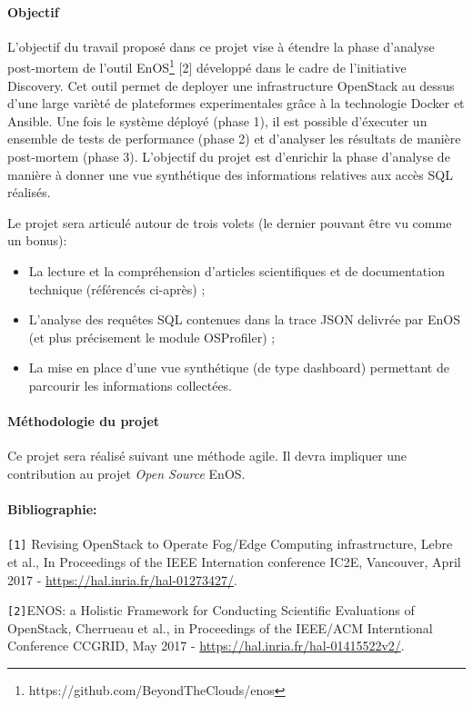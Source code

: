 \documentclass[a4paper,11pt]{article}
\begin{document}
\begin{note}
\paragraph*{Objectif\\}
L'objectif du travail proposé dans ce projet vise à étendre la phase
d'analyse post-mortem de l'outil
EnOS\footnote{https://github.com/BeyondTheClouds/enos} [2] développé dans
le cadre de l'initiative Discovery. Cet outil permet de
deployer une infrastructure OpenStack au dessus d'une large varièté de
plateformes experimentales grâce à la technologie Docker et Ansible.
Une fois le système déployé (phase 1), il est possible d'éxecuter un ensemble de tests de performance (phase 2) et d'analyser les résultats de manière post-mortem (phase 3).
L'objectif du projet est d'enrichir la phase d'analyse de manière à donner une vue synthétique des informations relatives aux accès SQL réalisés.

Le projet sera articulé autour de trois volets (le dernier pouvant être vu comme un bonus):
\begin{itemize}
\item La lecture et la compréhension d'articles scientifiques et de documentation technique (référencés ci-après) ; 
\item L'analyse des requêtes SQL contenues dans la trace JSON delivrée par EnOS (et plus précisement le module OSProfiler) ; 
\item La mise en place d'une vue synthétique (de type dashboard) permettant de parcourir les informations collectées.  
\end{itemize}

\paragraph*{Méthodologie du projet\\}
Ce projet sera réalisé suivant une méthode agile. Il devra impliquer une
contribution au projet \emph{Open Source} EnOS.


\paragraph*{Bibliographie:\\}
%
\texttt{[1]} Revising OpenStack to Operate Fog/Edge Computing infrastructure, Lebre et al., In Proceedings of the IEEE Internation conference IC2E, Vancouver, April 2017 - \url{https://hal.inria.fr/hal-01273427/}.

\texttt{[2]}ENOS: a Holistic Framework for Conducting Scientific Evaluations of OpenStack, Cherrueau et al., in Proceedings of the IEEE/ACM Interntional Conference CCGRID, May 2017 - \url{https://hal.inria.fr/hal-01415522v2/}.

\end{note}
\end{document}
